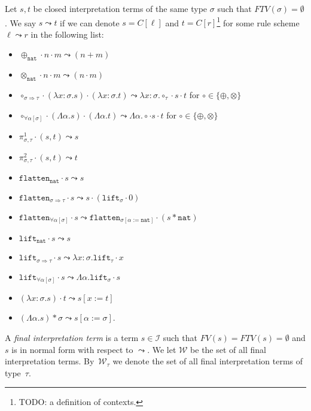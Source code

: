 \documentclass[runningheads,a4paper]{llncs}
\newcommand{\Iterms}{\mathcal{I}}
\newcommand{\World}{\mathcal{W}}
\newcommand{\quant}[2]{\forall #1[#2]}
\newcommand{\arrtype}{\Rightarrow}
\newcommand{\abs}[2]{\lambda #1.#2}
\newcommand{\tabs}[2]{\Lambda #1.#2}
\newcommand{\app}[2]{#1 \cdot #2}
\newcommand{\tapp}[2]{#1 * #2}
\newcommand{\subst}[2]{#1:=#2}
\newcommand{\FTV}{\mathit{FTV}}
\newcommand{\FV}{\mathit{FV}}
\newcommand{\nat}{\mathtt{nat}}
\newcommand{\proj}{\pi}
\newcommand{\flatten}{\mathtt{flatten}}
\newcommand{\lift}{\mathtt{lift}}
\begin{document}
\begin{definition}
Let $s,t$ be closed interpretation terms of the same type $\sigma$ such
that $\FTV(\sigma) = \emptyset$.  We say $s \leadsto t$ if we can denote
$s = C[\ell]$ and $t = C[r]$\footnote{TODO: a definition of contexts.}
for some rule scheme $\ell \leadsto r$ in the following list:
\begin{itemize}
\item $\app{\app{\oplus_{\nat}}{n}}{m} \leadsto (n+m)$ 
\item $\app{\app{\otimes_{\nat}}{n}}{m} \leadsto (n \cdot m)$ 
\item $\app{\app{\circ_{\sigma \arrtype \tau}}{(\abs{x:\sigma}{s})}}{
  (\abs{x:\sigma}{t})} \leadsto \abs{x:\sigma}{\app{\app{\circ_\tau}{
  s}}{t}}$ for $\circ \in \{ \oplus, \otimes \}$
\item $\app{\app{\circ_{\quant{\alpha}{\sigma}}}{(\tabs{\alpha}{s})}}{
  (\tabs{\alpha}{t})} \leadsto \tabs{\alpha}{\app{\app{\circ}{s}}{t}}$
  for $\circ \in \{ \oplus, \otimes \}$
\item $\app{\proj^1_{\sigma,\tau}}{(s,t)} \leadsto s$
\item $\app{\proj^2_{\sigma,\tau}}{(s,t)} \leadsto t$
\item $\app{\flatten_\nat}{s} \leadsto s$
\item $\app{\flatten_{\sigma \arrtype \tau}}{s} \leadsto
  \app{s}{(\app{\lift_\sigma}{0})}$
\item $\app{\flatten_{\quant{\alpha}{\sigma}}}{s} \leadsto
  \app{\flatten_{\sigma[\subst{\alpha}{\nat}]}}{(\tapp{s}{\nat})}$
\item $\app{\lift_\nat}{s} \leadsto s$
\item $\app{\lift_{\sigma \arrtype \tau}}{s} \leadsto
  \abs{x:\sigma}{\app{\lift_{\tau}}{x}}$
\item $\app{\lift_{\quant{\alpha}{\sigma}}}{s} \leadsto
  \tabs{\alpha}{\app{\lift_{\sigma}}{s}}$
\item $\app{(\abs{x:\sigma}{s})}{t} \leadsto s[\subst{x}{t}]$
\item $\tapp{(\tabs{\alpha}{s})}{\sigma} \leadsto
  s[\subst{\alpha}{\sigma}]$.
\end{itemize}
A \emph{final interpretation term} is a term $s \in \Iterms$ such that
$\FV(s) = \FTV(s) = \emptyset$ and $s$ is in normal form with respect
to $\leadsto$.  We let $\World$ be the set of all final interpretation
terms. By~$\World_\tau$ we denote the set of all final interpretation
terms of type~$\tau$.
\end{definition}
\end{document}
